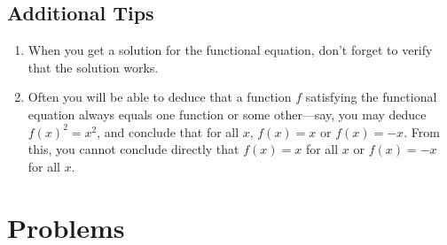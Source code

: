 \documentclass[11pt]{article}
\begin{document}
\subsection{Additional Tips}

\begin{enumerate}
  \item When you get a solution for the functional equation, don't forget to verify that the solution works. 
  \item Often you will be able to deduce that a function $f$ satisfying the functional equation always equals one function or some other---say, you may deduce $f(x)^2 = x^2$, and conclude that for all $x$, $f(x) = x$ or $f(x) = -x$. From this, you cannot conclude directly that $f(x) = x$ for all $x$ or $f(x) = -x$ for all $x$. 
\end{enumerate}

\section{Problems}
\end{document}
